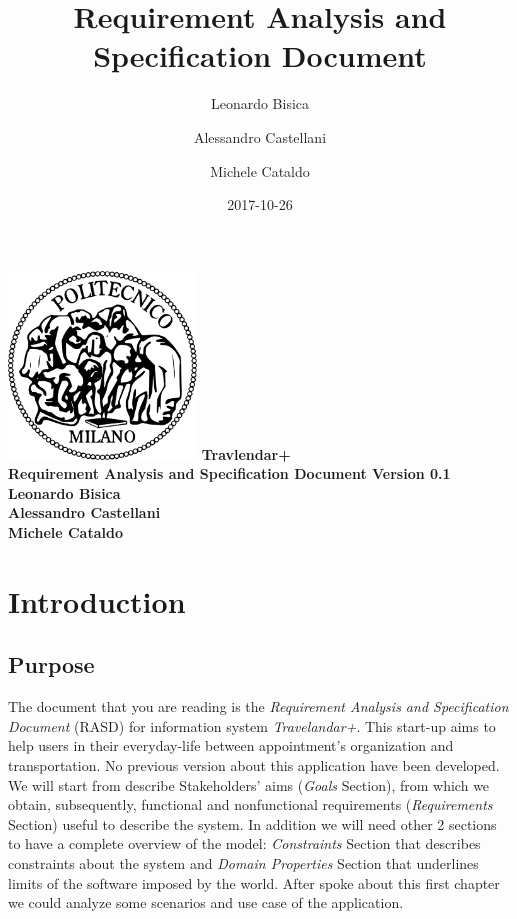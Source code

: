 \documentclass[12pt, a4paper]{article}
\title{Requirement Analysis and Specification Document}
\date{2017-10-26}
\author{
	Leonardo Bisica
	\and
	Alessandro Castellani
	\and
	Michele Cataldo
}
\begin{document}
	\begin{titlepage}
		\centering
		\includegraphics[width=5cm]{img/polimi_logo.png} %
		\vfill
		{\bfseries\Large
			Travlendar+\\
			Requirement Analysis and Specification Document
			Version 0.1\\
			\vskip4cm
			Leonardo Bisica\\
			Alessandro Castellani\\
			Michele Cataldo\\
		}
		\vfill
		\vfill
	\end{titlepage}

	\tableofcontents
	\newpage

	\section{Introduction}
		\subsection{Purpose}
		The document that you are reading is the \textit{Requirement Analysis and Specification Document} (RASD) for information system \textit{Travelandar+}.
		This start-up aims to help users in their everyday-life between appointment’s organization and transportation. No previous version about this application have been developed. 
We will start from describe Stakeholders’ aims (\textit{Goals} Section), from which we obtain, subsequently, functional and nonfunctional requirements (\textit{Requirements} Section) useful to describe the system.
		In addition we will need other 2 sections to have a complete overview of the model: \textit{Constraints} Section that describes constraints about the system and \textit{Domain Properties} Section that underlines limits of the software imposed by the world.
		After spoke about this first chapter we could analyze some scenarios and use case of the application.
			
\end{document}
